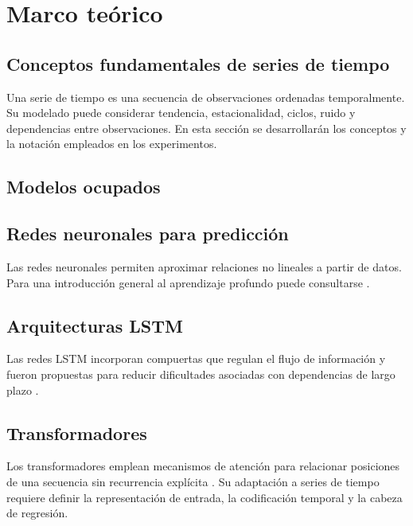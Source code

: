 \chapter{Marco teórico}

\section{Conceptos fundamentales de series de tiempo}

Una serie de tiempo es una secuencia de observaciones ordenadas temporalmente. Su modelado puede considerar tendencia, estacionalidad, ciclos, ruido y dependencias entre observaciones. En esta sección se desarrollarán los conceptos y la notación empleados en los experimentos.

\section{Modelos ocupados}

\section{Redes neuronales para predicción}

Las redes neuronales permiten aproximar relaciones no lineales a partir de datos. Para una introducción general al aprendizaje profundo puede consultarse \textcite{goodfellow2016deep}.

\section{Arquitecturas LSTM}

Las redes LSTM incorporan compuertas que regulan el flujo de información y fueron propuestas para reducir dificultades asociadas con dependencias de largo plazo \cite{hochreiter1997lstm}.

\section{Transformadores}

Los transformadores emplean mecanismos de atención para relacionar posiciones de una secuencia sin recurrencia explícita \cite{vaswani2017attention}. Su adaptación a series de tiempo requiere definir la representación de entrada, la codificación temporal y la cabeza de regresión.

